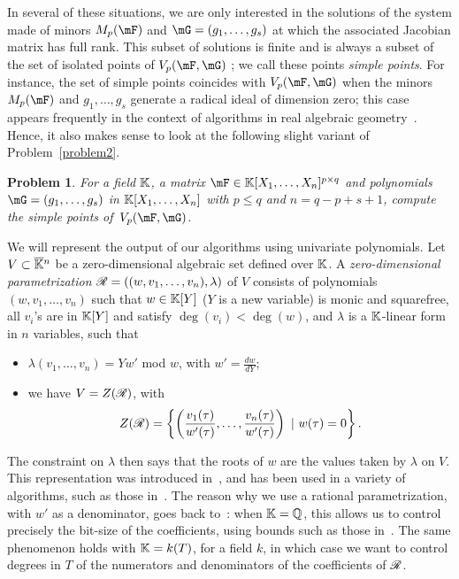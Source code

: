 \documentclass[12pt]{article}
\newtheorem{pbm}{Problem}
\begin{document}
In several of these situations, we are only interested in the
solutions of the system made of minors $M_p(\mF)$ and
$\mG=(g_1,\dots,g_s)$ at which the associated Jacobian matrix has full
rank. This subset of solutions is finite and is always a subset of the
set of isolated points of $\VpFG{p}{\mF}{\mG}$ \cite[Theorem
  16.19]{Eisenbud95}; we call these points {\em simple points}. For
instance, the set of simple points coincides with $\VpFG{p}{\mF}{\mG}$
when the minors $M_p(\mF)$ and $g_1,\dots,g_s$ generate a radical
ideal of dimension zero; this case appears frequently in the context
of algorithms in real algebraic geometry~\cite{BGHSS}.  Hence, it also
makes sense to look at the following slight variant of
Problem~\eqref{problem2}.

\begin{pbm} \label{problem3} For a field $\mathbb{K}$, a matrix
  $\mF \in \KK[X_1,\dots,X_n]^{p \times q}$ and polynomials
  $\mG=(g_1,\dots,g_s)$ in $\mathbb{K}[X_1,\dots,X_n]$ with $p \leq q$ and
  $n = q-p+s+1$, compute the simple  points of~$\VpFG{p}{\mF}{\mG}$.
\end{pbm}

We will represent the output of our algorithms using univariate polynomials. Let
$V \subset \overline{\mathbb{K}}{}^n$ be a zero-dimensional algebraic set defined over $\mathbb{K}$. A
\emph{zero-dimensional parametrization} $\mathscr{R} = ((w,v_1, \ldots, v_n),
\lambda)$ of $V$ consists of polynomials $(w,v_1, \ldots, v_n)$ such that $w \in
\mathbb{K}[Y]$ ($Y$ is a new variable) is monic and squarefree, all $v_i$'s are in
$\mathbb{K}[Y]$ and satisfy $\deg(v_i) < \deg(w)$, and $\lambda$ is a $\mathbb{K}$-linear form
in $n$ variables, such that
\begin{itemize}
\item $\lambda(v_1, \ldots, v_n) = Yw'$ mod $w$, with $w'=\frac{d w}{d Y}$;
\item we have $V = Z(\mathscr{R})$, with $$Z(\mathscr{R})= \left\{\left(\frac{v_1(\tau)}{w'(\tau)}, \ldots, \frac{v_n(\tau)}{w'(\tau)}\right) \ | \ w(\tau) = 0\right\}.$$
\end{itemize}
The constraint on $\lambda$ then says that the roots of $w$ are the
values taken by $\lambda$ on $V$. This representation was introduced
in~\cite{Kronecker82,Macaulay16}, and has been used in a variety of
algorithms, such as those
in~\cite{GiMo89,GiHeMoPa95,ABRW,GiHeMoMoPa98,Rouillier99,GiLeSa01}.
The reason why we use a rational parametrization, with $w'$ as a
denominator, goes back to~\cite{ABRW,Rouillier99,GiLeSa01}: when
$\mathbb{K}=\mathbb{Q}$, this allows us to control precisely the bit-size of the
coefficients, using bounds such as those
in~\cite{Schost03,DaSc04}. The same phenomenon holds with $\mathbb{K}=k(T)$,
for a field $k$, in which case we want to control degrees in $T$ of
the numerators and denominators of the coefficients of $\mathscr{R}$.
\end{document}
